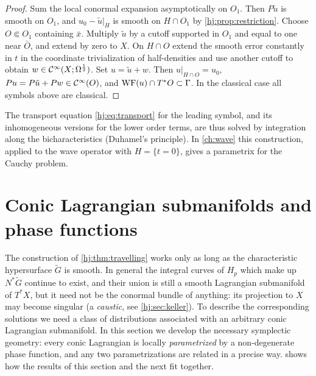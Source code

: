 \begin{proof}
  Sum the local conormal expansion asymptotically on $O_1$. Then $P\tilde u$
  is smooth on $O_1$, and $u_0-\tilde u|_H$ is smooth on $H\cap O_1$ by
  \cref{hj:prop:restriction}. Choose $O\Subset O_1$ containing $\bar x$.
  Multiply $\tilde u$ by a cutoff supported in $O_1$ and equal to one near
  $\bar O$, and extend by zero to $X$. On $H\cap O$ extend the smooth error
  constantly in $t$ in the coordinate trivialization of half-densities and
  use another cutoff to obtain $w\in\mathcal{C}^\infty(X;\Omega^{\frac12})$. Set $u=\tilde u+w$.  Then
  $u|_{H\cap O}=u_0$, $Pu=P\tilde u+Pw\in\mathcal{C}^\infty(O)$, and $\operatorname{WF}(u)\cap T^*O\subset\Gamma$.
  In the classical case all symbols above are classical.
\end{proof}

The transport equation \eqref{hj:eq:transport} for the leading symbol, and its
inhomogeneous versions for the lower order terms, are thus solved by integration
along the bicharacteristics (Duhamel's principle).  In \cref{ch:wave} this
construction, applied to the wave operator with $H=\{t=0\}$, gives a
parametrix for the Cauchy problem.

\section{Conic Lagrangian submanifolds and phase functions}\label{hj:sec:lagrangian}

The construction of \cref{hj:thm:travelling} works only as long as the
characteristic hypersurface $\tilde G$ is smooth.  In general the integral
curves of $H_p$ which make up $N^*\tilde G$ continue to exist, and their union
is still a smooth Lagrangian submanifold of $T^*X$, but it need not be the
conormal bundle of anything: its projection to $X$ may become singular (a
\emph{caustic}, see \cref{hj:sec:keller}).  To describe the corresponding
solutions we need a class of distributions associated with an arbitrary conic
Lagrangian submanifold.  In this section we develop the necessary symplectic
geometry: every conic Lagrangian is locally \emph{parametrized} by a
non-degenerate phase function, and any two parametrizations are related in a
precise way.  shows how the results of this section
and the next fit together.

